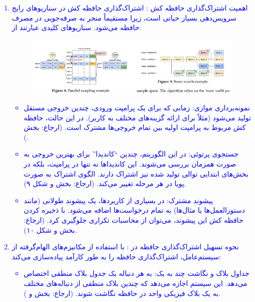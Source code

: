 \documentclass[12pt]{article}
\begin{document}
\begin{enumerate}
\begin{enumerate}
        \textcolor{blue}{
        \begin{enumerate}
            \item اهمیت اشتراک‌گذاری حافظه کش : اشتراک‌گذاری حافظه کش  در سناریوهای رایج سرویس‌دهی  بسیار حیاتی است، زیرا مستقیماً منجر به صرفه‌جویی در مصرف حافظه می‌شود. سناریوهای کلیدی عبارتند از:
            \begin{figure}[h]
                \centering
                \includegraphics[width=\textwidth]{figs/Q1_3.png}
                \label{fig:num_pic}  
            \end{figure}
            \begin{itemize}
                \item نمونه‌برداری موازی: زمانی که برای یک پرامپت ورودی، چندین خروجی مستقل تولید می‌شود (مثلاً برای ارائه گزینه‌های مختلف به کاربر). در این حالت، حافظه کش  مربوط به پرامپت اولیه بین تمام خروجی‌ها مشترک است. (ارجاع: بخش ).
                \item جستجوی پرتوئی: در این الگوریتم، چندین “کاندیدا” برای بهترین خروجی به صورت همزمان بررسی می‌شوند. این کاندیداها نه تنها در پرامپت، بلکه در بخش‌های ابتدایی توالی تولید شده نیز اشتراک دارند. الگوی اشتراک به صورت پویا در هر مرحله تغییر می‌کند. (ارجاع: بخش  و شکل ۹).
                \item پیشوند مشترک: در بسیاری از کاربردها، یک پیشوند طولانی (مانند دستورالعمل‌ها یا مثال‌ها) به تمام درخواست‌ها اضافه می‌شود. با ذخیره کردن حافظه کش  این پیشوند، می‌توان از محاسبات تکراری جلوگیری کرد. (ارجاع: بخش  و شکل ۱۰).
            \end{itemize}
            \item نحوه تسهیل اشتراک‌گذاری حافظه در :  با استفاده از مکانیزم‌های الهام‌گرفته از سیستم‌عامل، اشتراک‌گذاری حافظه را به طور کارآمد پیاده‌سازی می‌کند:
            \begin{itemize}
                \item جداول بلاک و نگاشت چند به یک:  به هر دنباله یک جدول بلاک منطقی اختصاص می‌دهد. این سیستم اجازه می‌دهد که چندین بلاک منطقی از دنباله‌های مختلف به یک بلاک فیزیکی واحد در حافظه  نگاشت شوند. (ارجاع: بخش  و ).

\end{itemize}
\end{enumerate}}
\end{enumerate}
\end{enumerate}
\end{document}
